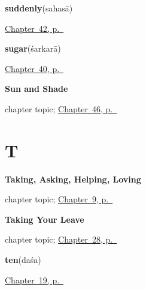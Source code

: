 \noindent\begin{minipage}[t]{\linewidth}
\raggedright
\textbf{suddenly}\enspace\emph{}\enspace(sahasā)\par
\footnotesize \hyperref[ch:sa-replies-third]{Chapter~42, p.~\pageref*{ch:sa-replies-third}}
\end{minipage}\par\smallskip

\noindent\begin{minipage}[t]{\linewidth}
\raggedright
\textbf{sugar}\enspace\emph{}\enspace(śarkarā)\par
\footnotesize \hyperref[ch:sa-in-the-kitchen]{Chapter~40, p.~\pageref*{ch:sa-in-the-kitchen}}
\end{minipage}\par\smallskip

\noindent\begin{minipage}[t]{\linewidth}
\raggedright
\textbf{Sun and Shade}\par
\footnotesize chapter topic; \hyperref[ch:sa-sun-and-shade]{Chapter~46, p.~\pageref*{ch:sa-sun-and-shade}}
\end{minipage}\par\smallskip

\section*{T}

\noindent\begin{minipage}[t]{\linewidth}
\raggedright
\textbf{Taking, Asking, Helping, Loving}\par
\footnotesize chapter topic; \hyperref[ch:sa-doing-verbs]{Chapter~9, p.~\pageref*{ch:sa-doing-verbs}}
\end{minipage}\par\smallskip

\noindent\begin{minipage}[t]{\linewidth}
\raggedright
\textbf{Taking Your Leave}\par
\footnotesize chapter topic; \hyperref[ch:sa-leave-more]{Chapter~28, p.~\pageref*{ch:sa-leave-more}}
\end{minipage}\par\smallskip

\noindent\begin{minipage}[t]{\linewidth}
\raggedright
\textbf{ten}\enspace\emph{}\enspace(daśa)\par
\footnotesize \hyperref[ch:sa-numbers-6-10]{Chapter~19, p.~\pageref*{ch:sa-numbers-6-10}}
\end{minipage}\par\smallskip

